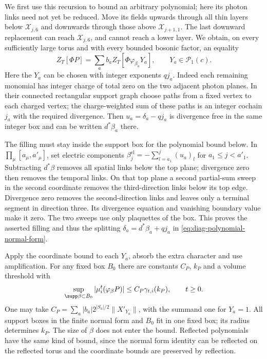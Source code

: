We first use this recursion to bound an arbitrary polynomial;
here its photon links need not yet be reduced. Move its fields
upwards through all thin layers below $\mathcal X_{j,6}$ and
downwards through those above $\mathcal X_{j+1,1}$. The last
downward replacement can reach $\mathcal X_{j,6}$, and cannot
reach a lower layer. We obtain, on every sufficiently large
torus and with every bounded bosonic factor, an equality
\begin{equation}\label{eq:diag-polynomial-normal-form}
 Z_T[\Phi P]=\sum_a b_a Z_T[\Phi\varphi_{\beta_a}Y_a],
 \qquad Y_a\in\mathcal P_1(c).
\end{equation}
Here the $Y_a$ can be chosen with integer exponents $qj_a$.
Indeed each remaining monomial has integer charge of total
zero on the two adjacent photon planes. In their connected
rectangular support graph choose paths from a fixed vertex
to each charged vertex; the charge-weighted sum of these
paths is an integer cochain $j_a$ with the required divergence.
Then $u_a=\delta_a-qj_a$ is divergence free in the same
integer box and can be written $d^*\beta_a$ there.

The filling must stay inside the support box for the polynomial
bound below. In
$\prod_\mu[a_\mu,a'_\mu]$, set electric components
$\beta_j^{\mathrm{el}}=-\sum_{l=a_1}^j(u_a)_l$ for
$a_1\le j<a'_1$. Subtracting $d^*\beta$ removes all spatial
links below the top plane; divergence zero then removes
the temporal links. On that top plane a second partial-sum
sweep in the second coordinate removes the third-direction
links below its top edge. Divergence zero removes the
second-direction links and leaves only a terminal segment
in direction three. Its divergence equation and vanishing
boundary value make it zero. The two sweeps use only
plaquettes of the box. This proves the asserted filling
and thus the splitting $\delta_a=d^*\beta_a+qj_a$ in
\eqref{eq:diag-polynomial-normal-form}.

Apply the coordinate bound to each $Y_a$, absorb the extra
character and use amplification. For any fixed box $B_0$
there are constants $C_P$, $k_P$ and a volume threshold with
\begin{equation}\label{eq:diag-polynomial-apriori}
 \sup_{\supp\beta\subset B_0}
       |\mu_i^t(\varphi_\beta P)|
             \le C_P\gamma_{t,i}(k_P),\qquad t\ge0.
\end{equation}
One may take
$C_P=\sum_a|b_a|2^{|S_a|/2}\|X'_{Y_a}\|$, with the summand
one for $Y_a=1$. All support boxes in the finite normal form
and $B_0$ fit in one fixed box; its radius determines $k_P$.
The size of $\beta$ does not enter the bound. Reflected
polynomials have the same kind of bound, since the normal
form identity can be reflected on the reflected torus and
the coordinate bounds are preserved by reflection.

